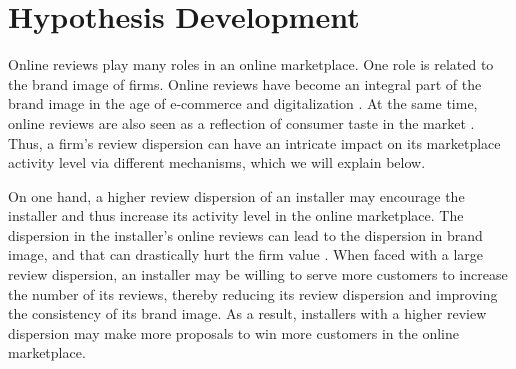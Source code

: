 \documentclass[mnsc,blindrev]{informs3}
\begin{document}
	
	
\section{Hypothesis Development} \label{Sec: Hypothesis}

	Online reviews play many roles in an online marketplace. One role is related to the brand image of firms. Online reviews have become an integral part of the brand image in the age of e-commerce and digitalization \citep{chakraborty2018credibility,chakraborty2018effects,brandimage}. At the same time, online reviews are also seen as a reflection of consumer taste in the market \citep{clemons2006online}. Thus, a firm's review dispersion can have an intricate impact on its marketplace activity level via different mechanisms, which we will explain below.


	On one hand,  a higher review dispersion of an installer may encourage the installer and thus increase its activity level in the online marketplace.  The dispersion in the installer's online reviews can lead to the dispersion in brand image, and that can drastically hurt the firm value \citep{luo2013impact}. When faced with a large review dispersion, an installer may be willing to serve more customers to increase the number of its reviews, thereby reducing its review dispersion and improving the consistency of its brand image. As a result, installers with a higher review dispersion may make more proposals to win more customers in the online marketplace.


\end{document}
